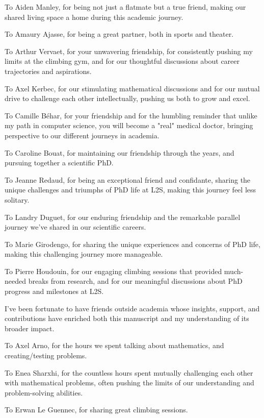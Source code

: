 To Aiden Manley, for being not just a flatmate but a true friend, making our shared living space a home during this academic journey.

To Amaury Ajasse, for being  a great partner, both in sports and theater.

To Arthur Vervaet, for your unwavering friendship, for consistently pushing my limits at the climbing gym, and for our thoughtful discussions about career trajectories and aspirations.

To Axel Kerbec, for our stimulating mathematical discussions and for our mutual drive to challenge each other intellectually, pushing us both to grow and excel.

To Camille Béhar, for your friendship and for the humbling reminder that unlike my path in computer science, you will become a "real" medical doctor, bringing perspective to our different journeys in academia.

To Caroline Bouat, for maintaining our friendship through the years, and pursuing together a scientific PhD.

To Jeanne Redaud, for being an exceptional friend and confidante, sharing the unique challenges and triumphs of PhD life at L2S, making this journey feel less solitary.

To Landry Duguet, for our enduring friendship and the remarkable parallel journey we've shared in our scientific careers.

To Marie Girodengo, for sharing the unique experiences and concerns of PhD life, making this challenging journey more manageable.

To Pierre Houdouin, for our engaging climbing sessions that provided much-needed breaks from research, and for our meaningful discussions about PhD progress and milestones at L2S.



I've been fortunate to have friends outside academia whose insights, support, and contributions have enriched both this manuscript and my understanding of its broader impact.

To Axel Arno, for the hours we spent talking about mathematics, and creating/testing problems.

To Enea Sharxhi, for the countless hours spent mutually challenging each other with mathematical problems, often pushing the limits of our understanding and problem-solving abilities.

To Erwan Le Guennec, for sharing great climbing sessions.

